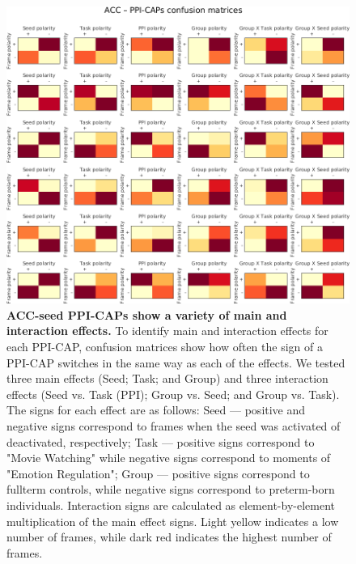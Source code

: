 \begin{figure}[h!]
\centering
\includegraphics[width=1\textwidth]{images/Ch5/ACCK6_PPICAPs_confusionMatrices2.png}
\caption{\textbf{ACC-seed PPI-CAPs show a variety of main and interaction effects.} To identify main and interaction effects for each PPI-CAP, confusion matrices show how often the sign of a PPI-CAP switches in the same way as each of the effects. We tested three main effects (Seed; Task; and Group) and three interaction effects (Seed vs. Task (PPI); Group vs. Seed; and Group vs. Task). The signs for each effect are as follows: Seed --- positive and negative signs correspond to frames when the seed was activated of deactivated, respectively;  Task --- positive signs correspond to "Movie Watching" while negative signs correspond to moments of "Emotion Regulation"; Group --- positive signs correspond to fullterm controls, while negative signs correspond to preterm-born individuals. Interaction signs are calculated as element-by-element multiplication of the main effect signs. Light yellow indicates a low number of frames, while dark red indicates the highest number of frames.}
\label{fig:acc_cm}
\end{figure}


